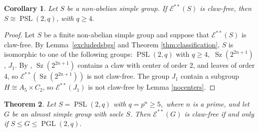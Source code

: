 \documentclass[preprint,11pt]{elsarticle}
\newcommand{\PSL}{\operatorname{PSL}}
\newcommand{\Sz}{\operatorname{Sz}}
\newtheorem{theorem}{\bf Theorem}[section]
\newtheorem{corollary}[theorem]{\bf Corollary}
\begin{document}
\begin{corollary}\label{semplici}Let $S$ be a non-abelian simple group. If $\mathcal E^{**}(S)$ is claw-free, then $S\cong \PSL(2,q)$, with $q\geq 4.$
	\end{corollary}
\begin{proof}
Let $S$ be a finite non-abelian simple group and suppose that $\mathcal E^{**}(S)$ is claw-free. By Lemma~\ref{excludedsbgs} and Theorem \ref{thm:classification}, 	$S$ is isomorphic to one of the following groups:
$
\PSL(2,q)$ with $q\geq 4,$
$\Sz(2^{2n+1})$,
$J_1.$ By \cite[Lemma 5.3]{claw-free-pwr-graph}, $\Sz(2^{2n+1})$ contains a claw with center of order 2, and leaves of order 4, so $\mathcal{E}^{**}(\Sz(2^{2n+1}))$ is not claw-free.
The group $J_1$ contain a subgroup $H\cong A_5\times C_2$, so $\mathcal E^{**}(J_1)$ is not claw-free by Lemma \ref{nocenters}.
\end{proof}

\begin{theorem}
	\label{PSL}
	Let
$S=\PSL(2,q)$ with $q=p^n\geq 5,$ where $n$ is a prime, and let $G$ be an almost simple group
	with socle $S$. 
	Then $\mathcal{E}^{**}(G)$ is claw-free if and only if 
		$S\leq G\leq \operatorname{PGL}(2,q).$ 
	\end{theorem}
\end{document}
